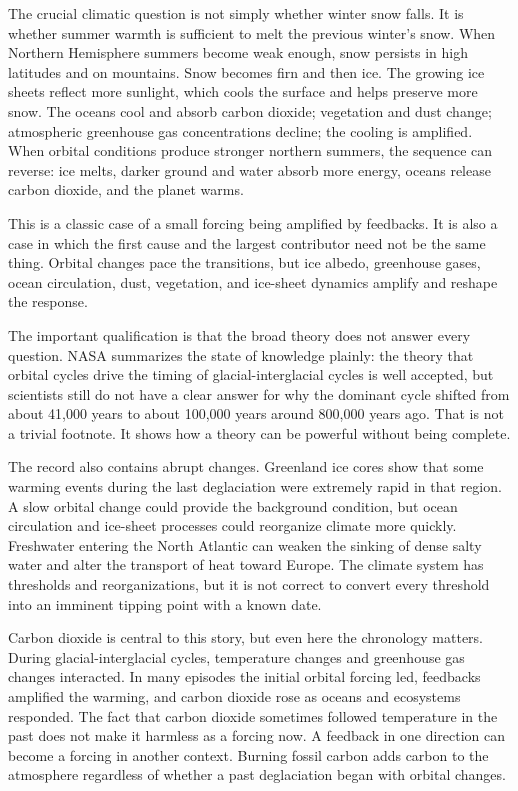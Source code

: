 ﻿\documentclass[12pt,a4paper]{book}
\begin{document}
The crucial climatic question is not simply whether winter snow falls. It is whether summer warmth is sufficient to melt the previous winter's snow. When Northern Hemisphere summers become weak enough, snow persists in high latitudes and on mountains. Snow becomes firn and then ice. The growing ice sheets reflect more sunlight, which cools the surface and helps preserve more snow. The oceans cool and absorb carbon dioxide; vegetation and dust change; atmospheric greenhouse gas concentrations decline; the cooling is amplified. When orbital conditions produce stronger northern summers, the sequence can reverse: ice melts, darker ground and water absorb more energy, oceans release carbon dioxide, and the planet warms.

This is a classic case of a small forcing being amplified by feedbacks. It is also a case in which the first cause and the largest contributor need not be the same thing. Orbital changes pace the transitions, but ice albedo, greenhouse gases, ocean circulation, dust, vegetation, and ice-sheet dynamics amplify and reshape the response.

The important qualification is that the broad theory does not answer every question. NASA summarizes the state of knowledge plainly: the theory that orbital cycles drive the timing of glacial-interglacial cycles is well accepted, but scientists still do not have a clear answer for why the dominant cycle shifted from about 41,000 years to about 100,000 years around 800,000 years ago. That is not a trivial footnote. It shows how a theory can be powerful without being complete. \cite{NASA2024Milankovitch}

The record also contains abrupt changes. Greenland ice cores show that some warming events during the last deglaciation were extremely rapid in that region. A slow orbital change could provide the background condition, but ocean circulation and ice-sheet processes could reorganize climate more quickly. Freshwater entering the North Atlantic can weaken the sinking of dense salty water and alter the transport of heat toward Europe. The climate system has thresholds and reorganizations, but it is not correct to convert every threshold into an imminent tipping point with a known date.

Carbon dioxide is central to this story, but even here the chronology matters. During glacial-interglacial cycles, temperature changes and greenhouse gas changes interacted. In many episodes the initial orbital forcing led, feedbacks amplified the warming, and carbon dioxide rose as oceans and ecosystems responded. The fact that carbon dioxide sometimes followed temperature in the past does not make it harmless as a forcing now. A feedback in one direction can become a forcing in another context. Burning fossil carbon adds carbon to the atmosphere regardless of whether a past deglaciation began with orbital changes.
\end{document}
